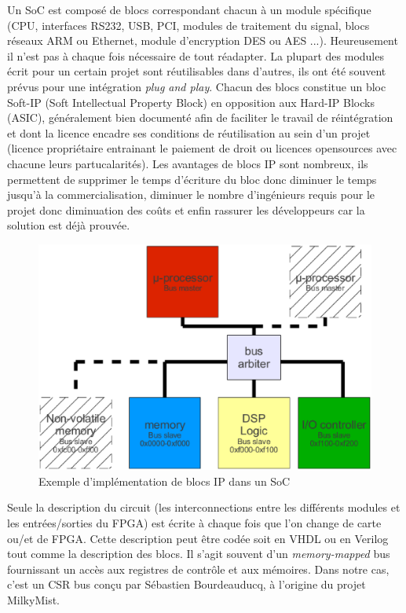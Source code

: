 Un SoC est composé de blocs correspondant chacun à un module spécifique (CPU, interfaces RS232, USB, PCI, modules de traitement du signal, blocs réseaux ARM ou Ethernet, module d'encryption DES ou AES ...). Heureusement il n'est pas à chaque fois nécessaire de tout réadapter. La plupart des modules écrit pour un certain projet sont réutilisables dans d'autres, ils ont été souvent prévus pour une intégration \textit{plug and play}. Chacun des blocs constitue un bloc Soft-IP (Soft Intellectual Property Block) en opposition aux Hard-IP Blocks (ASIC), généralement bien documenté afin de faciliter le travail de réintégration et dont la licence encadre ses conditions de réutilisation au sein d'un projet (licence propriétaire entrainant le paiement de droit ou licences opensources avec chacune leurs partucalarités). Les avantages de blocs IP sont nombreux, ils permettent de supprimer le temps d'écriture du bloc donc diminuer le temps jusqu'à la commercialisation, diminuer le nombre d'ingénieurs requis pour le projet donc diminuation des coûts  et enfin rassurer les développeurs car la solution est déjà prouvée.
\medskip

\begin{figure}[!h]
\begin{center}
\includegraphics[scale=0.4]{soc_arch.eps}
\caption{Exemple d'implémentation de blocs IP dans un SoC}
\label{Fig_impl_blocs}
\end{center}
\end{figure}

Seule la description du circuit (les interconnections entre les différents modules et les entrées/sorties du FPGA) est écrite à chaque fois que l'on change de carte ou/et de FPGA. Cette description peut être codée soit en VHDL ou en Verilog tout comme la description des blocs. Il s'agit souvent d'un \textit{memory-mapped} bus fournissant un accès aux registres de contrôle et aux mémoires. Dans notre cas, c'est un CSR bus conçu par Sébastien Bourdeauducq, à l'origine du projet MilkyMist.
\medskip

